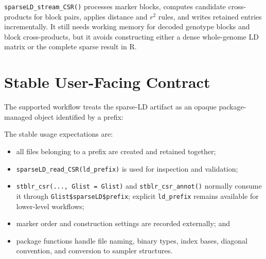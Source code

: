 \documentclass[
  11pt,
  letterpaper,
  DIV=11,
  numbers=noendperiod]{scrartcl}
\newenvironment{Shaded}{\begin{snugshade}}{\end{snugshade}}
\newcommand{\AttributeTok}[1]{\textcolor[rgb]{0.00,0.34,0.68}{#1}}
\newcommand{\ConstantTok}[1]{\textcolor[rgb]{0.67,0.33,0.00}{#1}}
\newcommand{\DecValTok}[1]{\textcolor[rgb]{0.69,0.50,0.00}{#1}}
\newcommand{\FloatTok}[1]{\textcolor[rgb]{0.69,0.50,0.00}{#1}}
\newcommand{\FunctionTok}[1]{\textcolor[rgb]{0.39,0.29,0.61}{#1}}
\newcommand{\NormalTok}[1]{\textcolor[rgb]{0.12,0.11,0.11}{#1}}
\newcommand{\OtherTok}[1]{\textcolor[rgb]{0.00,0.43,0.16}{#1}}
\newcommand{\SpecialCharTok}[1]{\textcolor[rgb]{0.24,0.68,0.91}{#1}}
\newcommand{\StringTok}[1]{\textcolor[rgb]{0.75,0.01,0.01}{#1}}
\providecommand{\tightlist}{%
  \setlength{\itemsep}{0pt}\setlength{\parskip}{0pt}}
\begin{document}
\texttt{sparseLD\_stream\_CSR()} processes marker blocks, computes
candidate cross-products for block pairs, applies distance and \(r^2\)
rules, and writes retained entries incrementally. It still needs working
memory for decoded genotype blocks and block cross-products, but it
avoids constructing either a dense whole-genome LD matrix or the
complete sparse result in R.

\section{Stable User-Facing Contract}\label{stable-user-facing-contract}

The supported workflow treats the sparse-LD artifact as an opaque
package- managed object identified by a prefix:

\begin{Shaded}
\end{Shaded}

The stable usage expectations are:

\begin{itemize}
\tightlist
\item
  all files belonging to a prefix are created and retained together;
\item
  \texttt{sparseLD\_read\_CSR(ld\_prefix)} is used for inspection and
  validation;
\item
  \texttt{stblr\_csr(...,\ Glist\ =\ Glist)} and
  \texttt{stblr\_csr\_annot()} normally consume it through
  \texttt{Glist\$sparseLD\$prefix}; explicit \texttt{ld\_prefix} remains
  available for lower-level workflows;
\item
  marker order and construction settings are recorded externally; and
\item
  package functions handle file naming, binary types, index bases,
  diagonal convention, and conversion to sampler structures.
\end{itemize}
\end{document}
